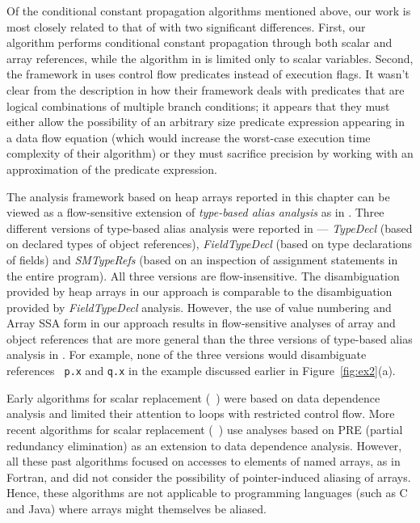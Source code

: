 Of the conditional constant propagation algorithms mentioned above,
our work is most closely related to that of \cite{ClCo95} with two 
significant differences.
First, our algorithm performs conditional constant propagation through
both scalar and array references, while the algorithm in \cite{ClCo95}
is limited only to scalar variables.
Second,  the framework in \cite{ClCo95}
uses control flow predicates instead of execution flags.
It wasn't clear from the description in \cite{ClCo95} how their framework
deals with predicates that are logical combinations of multiple branch
conditions; it appears that
they must either allow the possibility of
an arbitrary size predicate expression
appearing in a data flow equation (which would increase the worst-case
execution time complexity of their algorithm) or they must sacrifice
precision by working with an approximation of the predicate expression.


The analysis framework based on heap arrays reported in this chapter 
can be viewed as a flow-sensitive extension of
{\it type-based alias analysis} as in \cite{DiwanMM1998}.
Three different versions of type-based alias analysis were reported in
\cite{DiwanMM1998} --- {\it TypeDecl} (based on declared types of object
references), {\it FieldTypeDecl} (based on type declarations of
fields) and {\it SMTypeRefs} (based on an inspection of assignment
statements in the entire program).  All three versions are
flow-insensitive.  The disambiguation provided by heap arrays in our
approach is comparable to the disambiguation provided by {\it
FieldTypeDecl} analysis.  However, the use of value numbering and
Array SSA form in our approach results in flow-sensitive analyses of
array and object references that are more general than the three
versions of type-based alias analysis in \cite{DiwanMM1998}.  For
example, none of the three versions would disambiguate references {\tt
p.x} and {\tt q.x} in the example discussed earlier in
Figure~\ref{fig:ex2}(a).

Early algorithms for scalar replacement (\eg\
\cite{CaCK90}) were based on data dependence analysis and limited
their attention to loops with restricted control flow.
More recent algorithms for scalar replacement (\eg\
\cite{CaKe94,BoGu95}) use analyses based on PRE (partial redundancy
elimination) as an extension to data dependence analysis.  However,
all these past algorithms focused on accesses to elements of named
arrays, as in Fortran, and did not consider the possibility of
pointer-induced aliasing of arrays.  Hence, these algorithms are not
applicable to programming languages (such as C and Java) where arrays
might themselves be aliased.

